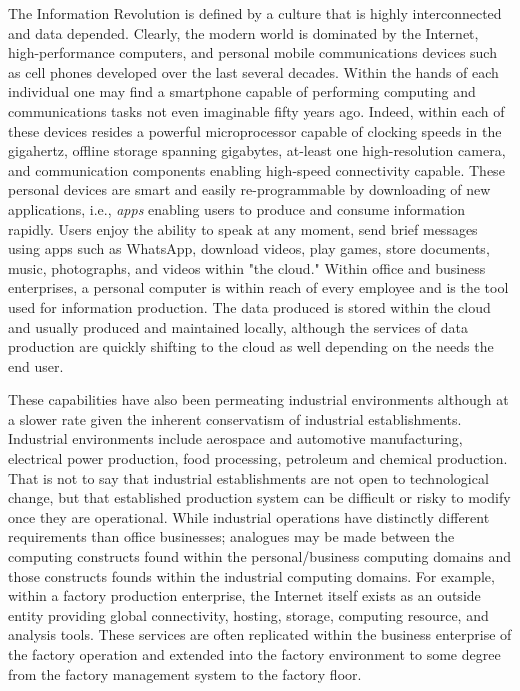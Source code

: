 \documentclass[english]{spimubphdthesis}
\begin{document}
The Information Revolution is defined by a culture that is highly interconnected and data depended.  Clearly, the modern world is dominated by the Internet, high-performance computers, and personal mobile communications devices such as cell phones developed over the last several decades. Within the hands of each individual one may find a smartphone capable of performing computing and communications tasks not even imaginable fifty years ago.  Indeed, within each of these devices resides a powerful microprocessor capable of clocking speeds in the gigahertz, offline storage spanning gigabytes, at-least one high-resolution camera, and communication components enabling high-speed connectivity capable.  These personal devices are smart and easily re-programmable by downloading of new applications, i.e., \textit{apps} enabling users to produce and consume information rapidly.  Users enjoy the ability to speak at any moment, send brief messages using apps such as WhatsApp\texttrademark, download videos, play games, store documents, music, photographs, and videos within "the cloud."  Within office and business enterprises, a personal computer is within reach of every employee and is the tool used for information production.  The data produced is stored within the cloud and usually produced and maintained locally, although the services of data production are quickly shifting to the cloud as well depending on the needs the end user.

These capabilities have also been permeating industrial environments although at a slower rate given the inherent conservatism of industrial establishments.  Industrial environments include aerospace and automotive manufacturing, electrical power production, food processing, petroleum and chemical production.  That is not to say that industrial establishments are not open to technological change, but that established production system can be difficult or risky to modify once they are operational.  While industrial operations have distinctly different requirements than office businesses; analogues may be made between the computing constructs found within the personal/business computing domains and those constructs founds within the industrial computing domains.  For example, within a factory production enterprise, the Internet itself exists as an outside entity providing global connectivity, hosting, storage, computing resource, and analysis tools.  These services are often replicated within the business enterprise of the factory operation and extended into the factory environment to some degree from the factory management system to the factory floor.  
\end{document}
